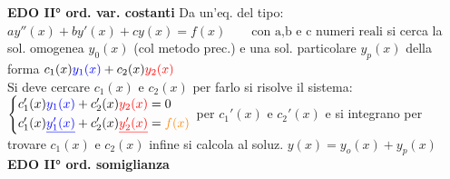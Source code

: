 \documentclass[a4paper, oneside]{article}
\newcommand{\tab}{\hspace*{2em}}
\begin{document}
\textbf{EDO II° ord. var. costanti} Da un'eq. del tipo: $a y''(x) + b y'(x) + c y(x) = f(x) \qquad \text{con a,b e c numeri reali}$ si cerca la sol. omogenea $y_0(x)$ (col metodo prec.) e una sol. particolare $y_p(x)$ della forma $c_1(x) \textcolor{blue}{y_1(x)} + c_2(x) \textcolor{red}{y_2(x)}$\\
Si deve cercare $c_1(x)$ e $c_2(x)$ per farlo si risolve il sistema: $        \begin{cases*}
            c_1'(x) \text{\textcolor{blue}{$y_1(x)$}} + c_2'(x) \text{\textcolor{red}{$y_2(x)$}} = 0\\
            c_1'(x) \text{\textcolor{blue}{$\underline{y_1'(x)}$}} + c_2'(x) \text{\textcolor{red}{$\underline{y_2'(x)}$}} = \textcolor{orange}{f(x)}\\
        \end{cases*}$ per $c_1'(x)$ e $c_2'(x)$ e si integrano per trovare $c_1(x)$ e $c_2(x)$ \tab infine si calcola al soluz. $y(x) = y_o(x) + y_p(x)$\\
\textbf{EDO II° ord. somiglianza} 
\end{document}
